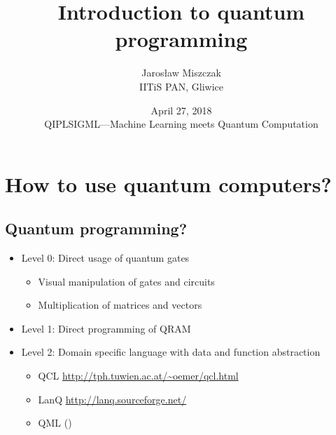 \documentclass{beamer}
\title{Introduction to quantum programming}
\author{Jaros\l aw Miszczak\\ IITiS PAN, Gliwice}
\date{April 27, 2018\\ QIPLSIGML---Machine Learning meets Quantum Computation}
\begin{document}
\begin{frame}{}
   \maketitle 
\end{frame}

\begin{frame}{}
    \tableofcontents
\end{frame}


\section{How to use quantum computers?}

\subsection{Quantum programming?}

\begin{frame}{\insertsection}{\insertsubsection}
	
	
\end{frame}

\begin{frame}{\insertsection}{\insertsubsection}

  \begin{itemize}
    \item Level 0: Direct usage of quantum gates
        \begin{itemize}
            \item Visual manipulation of gates and circuits
            \item Multiplication of matrices and vectors 
        \end{itemize}
    \item Level 1: Direct programming of QRAM 
    \item Level 2: Domain specific language with data and function abstraction
        \begin{itemize}
            \item QCL \url{http://tph.tuwien.ac.at/~oemer/qcl.html}
            \item LanQ \url{http://lanq.sourceforge.net/}
            \item QML ()
        \end{itemize}
  \end{itemize}
\end{frame}
\end{document}
